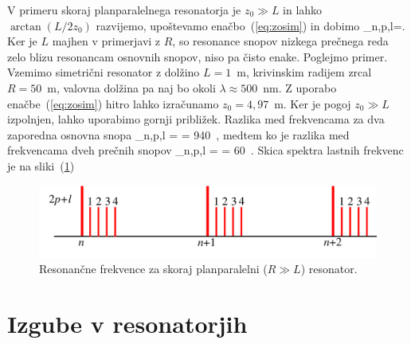 \noindent
V primeru skoraj planparalelnega 
resonatorja je $z_{0}\gg L$ in lahko
$\arctan(L/2z_{0})$ razvijemo, upoštevamo enačbo~(\ref{eq:zosim}) in dobimo
\beq
\omega_{n,p,l}=.
\eeq
Ker je $L$ majhen v primerjavi z $R$, so resonance snopov nizkega prečnega reda 
zelo blizu resonancam osnovnih snopov, niso pa čisto enake. Poglejmo primer. Vzemimo 
simetrični resonator z dolžino $L=1$~m, krivinskim radijem zrcal $R=50$~m, 
valovna dolžina pa naj bo okoli $\lambda \approx 500$~nm. Z uporabo enačbe~(\ref{eq:zosim})
hitro lahko izračunamo $z_0 = 4,97$~m. Ker je pogoj $z_0\gg L$ izpolnjen, lahko uporabimo
gornji približek. Razlika med frekvencama za dva zaporedna osnovna snopa 
\beq
\Delta \omega_{n,p,l} =  = 940~,
\eeq
medtem ko je razlika med frekvencama dveh prečnih snopov
\beq
\Delta \omega_{n,p,l} =   = 60~.
\eeq
Skica spektra lastnih frekvenc je na sliki~(\ref{fig:crte})
\begin{figure}[h]
\centering
\includegraphics[width=10truecm]{slike/04_crte.png}
\caption{Resonančne frekvence za skoraj planparalelni ($R\gg L$) resonator.}
\label{fig:crte}
\end{figure}

\section{Izgube v resonatorjih}

